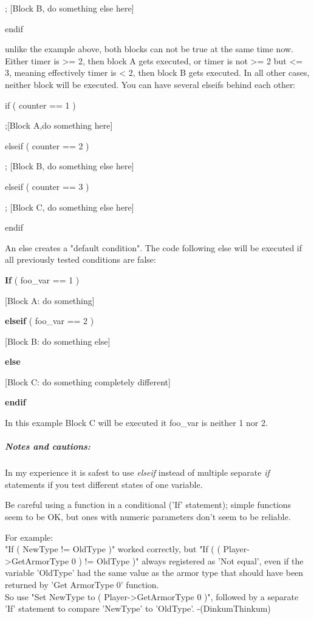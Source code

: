 \documentclass[
]{article}
\begin{document}
; {[}Block B, do something else here{]}

endif

unlike the example above, both blocks can not be true at the same time
now. Either timer is \textgreater= 2, then block A gets executed, or
timer is not \textgreater= 2 but \textless= 3, meaning effectively timer
is \textless{} 2, then block B gets executed. In all other cases,
neither block will be executed. You can have several elseifs behind each
other:

if ( counter == 1 )

;{[}Block A,do something here{]}

elseif ( counter == 2 )

; {[}Block B, do something else here{]}

elseif ( counter == 3 )

; {[}Block C, do something else here{]}

endif

An else creates a "default condition". The code following else will be
executed if all previously tested conditions are false:

\textbf{If} ( foo\_var == 1 )

{[}Block A: do something{]}

\textbf{elseif} ( foo\_var == 2 )

{[}Block B: do something else{]}

\textbf{else}

{[}Block C: do something completely different{]}

\textbf{endif}

In this example Block C will be executed it foo\_var is neither 1 nor 2.

\hypertarget{notes-and-cautions}{%
\subparagraph{Notes and cautions:}\label{notes-and-cautions}}

In my experience it is safest to use \emph{elseif} instead of multiple
separate \emph{if} statements if you test different states of one
variable.

Be careful using a function in a conditional ('If' statement); simple
functions seem to be OK, but ones with numeric parameters don't seem to
be reliable.

For example:\\
"If ( NewType != OldType )" worked correctly, but "If ( (
Player-\textgreater GetArmorType 0 ) != OldType )" always registered as
'Not equal', even if the variable 'OldType' had the same value as the
armor type that should have been returned by 'Get ArmorType 0'
function.\\
So use "Set NewType to ( Player-\textgreater GetArmorType 0 )", followed
by a separate 'If' statement to compare 'NewType' to 'OldType'.
-(DinkumThinkum)
\end{document}
